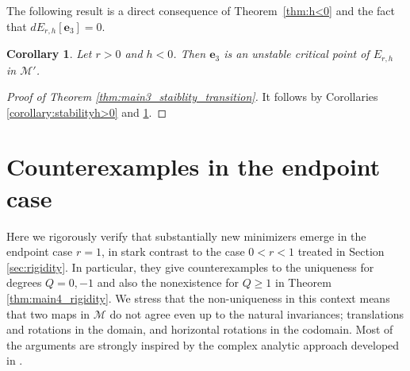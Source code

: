 \documentclass{amsart}
\numberwithin{equation}{section}
\newtheorem{corollary}[theorem]{Corollary}
\theoremstyle{definition}
\theoremstyle{remark}
\newcommand{\R}{\mathbb{R}}
\newcommand{\boM}{\mathcal{M}}
\newcommand{\rd}{{\partial}}								%
\newcommand{\nab}{{\nabla}}							%
\newcommand{\bn}{{\mathbf{n}}}
\newcommand{\boe}{{\mathbf{e}}}
\newcommand{\bphi}{{\bm{\phi}}}
\begin{document}
The following result is a direct consequence of Theorem~\ref{thm:h<0} and the fact that $dE_{r,h}[\boe_3] = 0$.

\begin{corollary}\label{corollary:stabilityh<0}
Let $r>0$ and $h<0$. Then $\boe_3$ is an unstable critical point of $E_{r,h}$ in $\boM'$.
\end{corollary}

\begin{proof}[Proof of Theorem \ref{thm:main3_staiblity_transition}]
    It follows by Corollaries \ref{corollary:stabilityh>0} and \ref{corollary:stabilityh<0}.
\end{proof}



\appendix

\section{Counterexamples in the endpoint case}\label{sec:couterexample_endpoint}

Here we rigorously verify that substantially new minimizers emerge in the endpoint case $r=1$, in stark contrast to the case $0<r<1$ treated in Section \ref{sec:rigidity}.
In particular, they give counterexamples to the uniqueness for degrees $Q=0,-1$ and also the nonexistence for $Q\geq1$ in Theorem \ref{thm:main4_rigidity}.
We stress that the non-uniqueness in this context means that two maps in $\boM$ do not agree even up to the natural invariances; translations and rotations in the domain, and horizontal rotations in the codomain.
Most of the arguments are strongly inspired by the complex analytic approach developed in \cite{MR4091507}.
\end{document}
